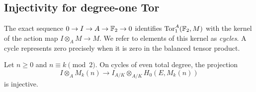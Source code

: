 \subsection{Injectivity for degree-one Tor}

The exact sequence $0\to I\to A\to\mathbb F_2\to0$ identifies
$\operatorname{Tor}_1^A(\mathbb F_2,M)$ with the kernel of the action map
$I\otimes_A M\to M$.  We refer to elements of this kernel as
\emph{cycles}.  A cycle represents zero precisely when it is zero in
the balanced tensor product.

\begin{lemma}\label{lem:tor-injection}
Let $n\geq0$ and $n\equiv k\pmod2$.  On cycles of even total degree,
the projection
\begin{equation}\label{eq:tor-injection}
 I\otimes_A M_k(n)\longrightarrow
 I_{A/K}\otimes_{A/K}H_0(E,M_k(n))
\end{equation}
is injective.
\end{lemma}

